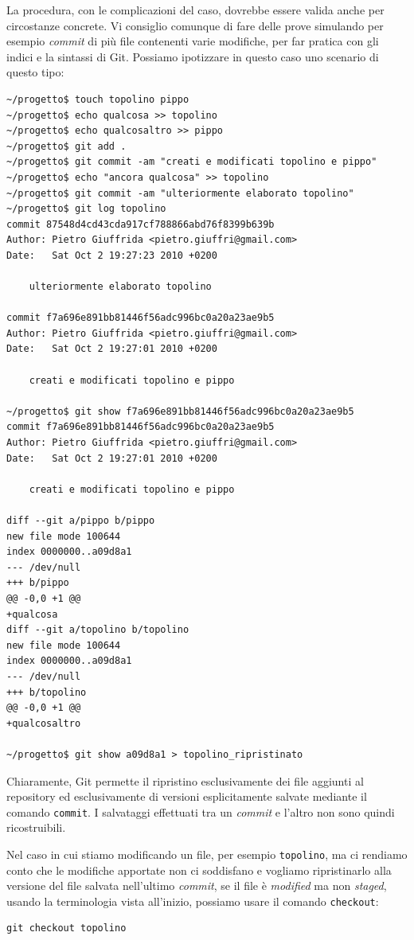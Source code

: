 \documentclass[a4paper,12pt,oneside]{article}
\begin{document}
La procedura, con le complicazioni del caso, dovrebbe essere valida anche per
circostanze concrete. Vi consiglio comunque di fare delle prove simulando per
esempio \emph{commit} di più file contenenti varie modifiche, per far pratica
con gli indici e la sintassi di Git.
Possiamo ipotizzare in questo caso uno scenario di questo tipo:
\begin{lstlisting}
~/progetto$ touch topolino pippo
~/progetto$ echo qualcosa >> topolino
~/progetto$ echo qualcosaltro >> pippo
~/progetto$ git add .
~/progetto$ git commit -am "creati e modificati topolino e pippo"
~/progetto$ echo "ancora qualcosa" >> topolino
~/progetto$ git commit -am "ulteriormente elaborato topolino"
~/progetto$ git log topolino
commit 87548d4cd43cda917cf788866abd76f8399b639b
Author: Pietro Giuffrida <pietro.giuffri@gmail.com>
Date:   Sat Oct 2 19:27:23 2010 +0200

    ulteriormente elaborato topolino

commit f7a696e891bb81446f56adc996bc0a20a23ae9b5
Author: Pietro Giuffrida <pietro.giuffri@gmail.com>
Date:   Sat Oct 2 19:27:01 2010 +0200

    creati e modificati topolino e pippo

~/progetto$ git show f7a696e891bb81446f56adc996bc0a20a23ae9b5
commit f7a696e891bb81446f56adc996bc0a20a23ae9b5
Author: Pietro Giuffrida <pietro.giuffri@gmail.com>
Date:   Sat Oct 2 19:27:01 2010 +0200

    creati e modificati topolino e pippo

diff --git a/pippo b/pippo
new file mode 100644
index 0000000..a09d8a1
--- /dev/null
+++ b/pippo
@@ -0,0 +1 @@
+qualcosa
diff --git a/topolino b/topolino
new file mode 100644
index 0000000..a09d8a1
--- /dev/null
+++ b/topolino
@@ -0,0 +1 @@
+qualcosaltro

~/progetto$ git show a09d8a1 > topolino_ripristinato
\end{lstlisting}

Chiaramente, Git permette il ripristino esclusivamente dei file aggiunti al
repository ed esclusivamente di versioni esplicitamente salvate mediante il
comando \lstinline|commit|. I salvataggi effettuati tra un \emph{commit} e
l'altro non sono quindi ricostruibili.

Nel caso in cui stiamo modificando un file, per esempio
\lstinline|topolino|, ma ci rendiamo conto che le modifiche apportate non ci
soddisfano e vogliamo ripristinarlo alla versione del file salvata nell'ultimo
\emph{commit}, se il file è \emph{modified} ma non \emph{staged}, usando la
terminologia vista all'inizio, possiamo usare il comando \lstinline|checkout|:
\begin{lstlisting}
git checkout topolino
\end{lstlisting}
\end{document}

